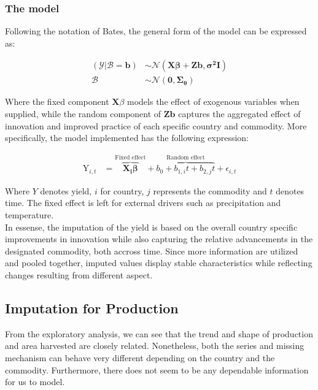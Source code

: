 \documentclass[nojss]{jss}\usepackage[]{graphicx}\usepackage[]{color}
\begin{document}
\subsubsection{The model}
Following the notation of Bates, the general form of the model can be
expressed as:

\begin{align}
  (\mathscr{Y}|\mathscr{B} = \mathbf{b}) &\sim
  \mathscr{N}(\mathbf{X}\boldsymbol{\beta} + \mathbf{Z}\mathbf{b},
  \boldsymbol{\sigma^2}\mathbf{I})\nonumber \\
  \mathscr{B} &\sim\mathscr{N}(\mathbf{0}, \boldsymbol{\Sigma_\theta})
\end{align}

Where the fixed component $\mathbf{X}\mathscr{\beta}$ models the
effect of exogenous variables when supplied, while the random
component of $\mathbf{Z}\mathbf{b}$ captures the aggregated effect of
innovation and improved practice of each specific country and
commodity. More specifically, the model implemented has the following
expression:

\begin{align}
  \label{eq:lmeImpute}
  \text{Y}_{i,t} &= \overbrace{\mathbf{X_i}\boldsymbol{\beta}}^{\text{Fixed effect}} +
  \overbrace{b_{0} + b_{1, i}t + b_{2, j}t}^{\text{Random effect}} +
  \epsilon_{i,t}
\end{align}

Where $Y$ denotes yield, $i$ for country, $j$ represents the commodity
and $t$ denotes time. The fixed effect is left for external drivers
such as precipitation and temperature.\\

In essense, the imputation of the yield is based on the overall
country specific improvements in innovation while also capturing the
relative advancements in the designated commodity, both accross
time. Since more information are utilized and pooled together, imputed
values display stable characteristics while reflecting changes
resulting from different aspect.\\



\FloatBarrier
\subsection{Imputation for Production}

From the exploratory analysis, we can see that the trend and shape of
production and area harvested are closely related. Nonetheless, both
the series and missing mechanism can behave very different depending
on the country and the commodity. Furthermore, there does not seem to
be any dependable information for us to model.\\
\end{document}
